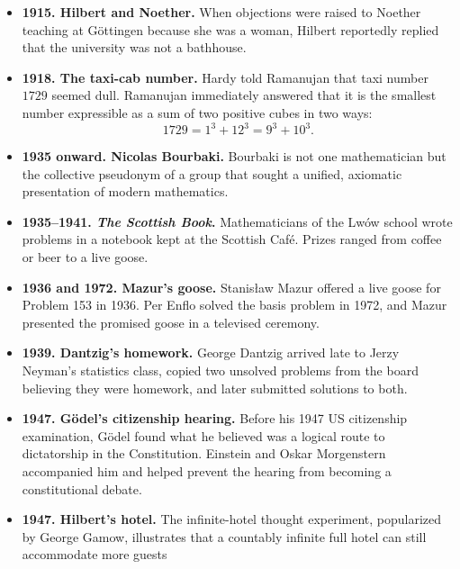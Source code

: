 \begin{itemize}
              orally present all twenty-three problems; ten were delivered in
              the lecture, while the complete list appeared in print.
        \item \textbf{1915. Hilbert and Noether.} When objections were raised to
              Noether teaching at Göttingen because she was a woman, Hilbert
              reportedly replied that the university was not a bathhouse.
        \item \textbf{1918. The taxi-cab number.} Hardy told Ramanujan that taxi
              number $1729$ seemed dull. Ramanujan immediately answered that it
              is the smallest number expressible as a sum of two positive cubes
              in two ways:
              \[
                  1729=1^3+12^3=9^3+10^3.
              \]
        \item \textbf{1935 onward. Nicolas Bourbaki.} Bourbaki is not one mathematician but
              the collective pseudonym of a group that sought a unified,
              axiomatic presentation of modern mathematics.
        \item \textbf{1935--1941. \textit{The Scottish Book}.} Mathematicians of the Lwów
              school wrote problems in a notebook kept at the Scottish Café.
              Prizes ranged from coffee or beer to a live goose.
        \item \textbf{1936 and 1972. Mazur's goose.} Stanisław Mazur offered a live goose for
              Problem 153 in 1936. Per Enflo solved the basis problem in 1972,
              and Mazur presented the promised goose in a televised ceremony.
        \item \textbf{1939. Dantzig's homework.} George Dantzig arrived late to
              Jerzy Neyman's statistics class, copied two unsolved problems
              from the board believing they were homework, and later submitted
              solutions to both.
        \item \textbf{1947. Gödel's citizenship hearing.} Before his 1947 US
              citizenship examination, Gödel found what he believed was a
              logical route to dictatorship in the Constitution. Einstein and
              Oskar Morgenstern accompanied him and helped prevent the hearing
              from becoming a constitutional debate.
        \item \textbf{1947. Hilbert's hotel.} The infinite-hotel thought
              experiment, popularized by George Gamow, illustrates that a
              countably infinite full hotel can still accommodate more guests

\end{itemize}
